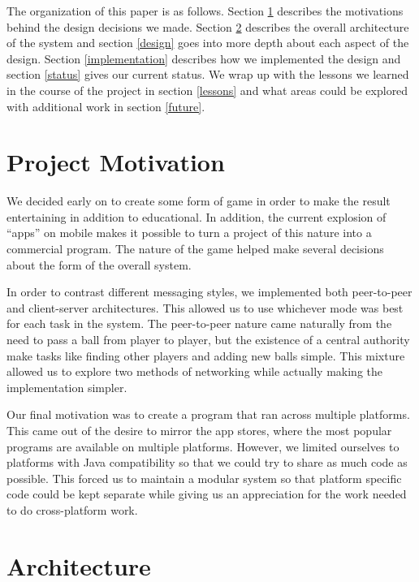 \documentclass{sig-alternate}
\begin{document}
The organization of this paper is as follows.  Section \ref{motivation}
describes the motivations behind the design decisions we made.  Section
\ref{architecture} describes the overall architecture of the system and
section \ref{design} goes into more depth about each aspect of the design.
Section \ref{implementation} describes how we implemented the design and
section \ref{status} gives our current status.  We wrap up with the lessons
we learned in the course of the project in section \ref{lessons} and what
areas could be explored with additional work in section \ref{future}.


\section{Project Motivation}
\label{motivation}

We decided early on to create some form of game in order to make the result
entertaining in addition to educational.  In addition, the current
explosion of ``apps'' on mobile makes it possible to turn a project of this
nature into a commercial program.  The nature of the game helped make
several decisions about the form of the overall system.

In order to contrast different messaging styles, we implemented both
peer-to-peer and client-server architectures.  This allowed us to use
whichever mode was best for each task in the system.  The peer-to-peer
nature came naturally from the need to pass a ball from player to player,
but the existence of a central authority make tasks like finding other
players and adding new balls simple.  This mixture allowed us to explore
two methods of networking while actually making the implementation simpler.

Our final motivation was to create a program that ran across multiple
platforms.  This came out of the desire to mirror the app stores, where the
most popular programs are available on multiple platforms.  However, we
limited ourselves to platforms with Java compatibility so that we could try
to share as much code as possible.  This forced us to maintain a modular
system so that platform specific code could be kept separate while giving
us an appreciation for the work needed to do cross-platform work.


\section{Architecture}
\label{architecture}
\end{document}
